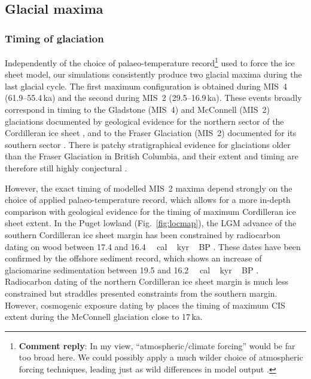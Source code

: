 \documentclass[tc, manuscript]{copernicus}
\newcommand{\renote}[1]{\footnote{\textbf{Comment reply}: #1}}
\begin{document}
\subsection{Glacial maxima}

\subsubsection{Timing of glaciation}

Independently of the choice of palaeo-temperature record\renote{
    In my view, ``atmospheric/climate forcing'' would be far too broad here. We
    could possibly apply a much wilder choice of atmospheric forcing
    techniques, leading just as wild differences in model output
    \citep[e.g.,][but possibly much more than that]{Seguinot.etal.2014}.}
used to force the ice sheet model, our simulations consistently produce two
glacial maxima during the last glacial cycle. The first maximum configuration
is obtained during MIS~4 (61.9--55.4\,ka) and the second during MIS~2
(29.5--16.9\,ka). These events broadly correspond in timing to the Gladstone
(MIS~4) and McConnell (MIS~2) glaciations documented by geological evidence for
the northern sector of the Cordilleran ice sheet
    \citep{Duk-Rodkin.etal.1996, Ward.etal.2007,
           Stroeven.etal.2010, Stroeven.etal.2014},
and to the Fraser Glaciation (MIS~2) documented for its southern sector
    \citep{Porter.Swanson.1998, Margold.etal.2014}.
There is patchy stratigraphical evidence for glaciations older than the Fraser
Glaciation \citep{Clague.Ward.2011} in British Columbia, and their extent and
timing are therefore still highly conjectural
    \citep[perhaps MIS~4 or early MIS~3; e.g.,][]{Cosma.etal.2008}.

However, the exact timing of modelled MIS~2 maxima depend strongly on the
choice of applied palaeo-temperature record, which allows for a more in-depth
comparison with geological evidence for the timing of maximum Cordilleran ice
sheet extent. In the Puget lowland (Fig.~\ref{fig:locmap}), the LGM advance of
the southern Cordilleran ice sheet margin has been constrained by radiocarbon
dating on wood between 17.4 and 16.4\,\unit{\,cal\,kyr\,BP}
\citep{Porter.Swanson.1998}.
These dates have been confirmed by the offshore sediment record, which shows an
increase of glaciomarine sedimentation between 19.5 and
16.2\,\unit{\,cal\,kyr\,BP} \citep{Cosma.etal.2008}. Radiocarbon
dating of the northern Cordilleran ice sheet margin is much less constrained
but straddles presented constraints from the southern margin. However,
cosmogenic exposure dating by \citep{Stroeven.etal.2010, Stroeven.etal.2014}
places the timing of maximum CIS extent during the McConnell glaciation close
to 17\,ka.
\end{document}
